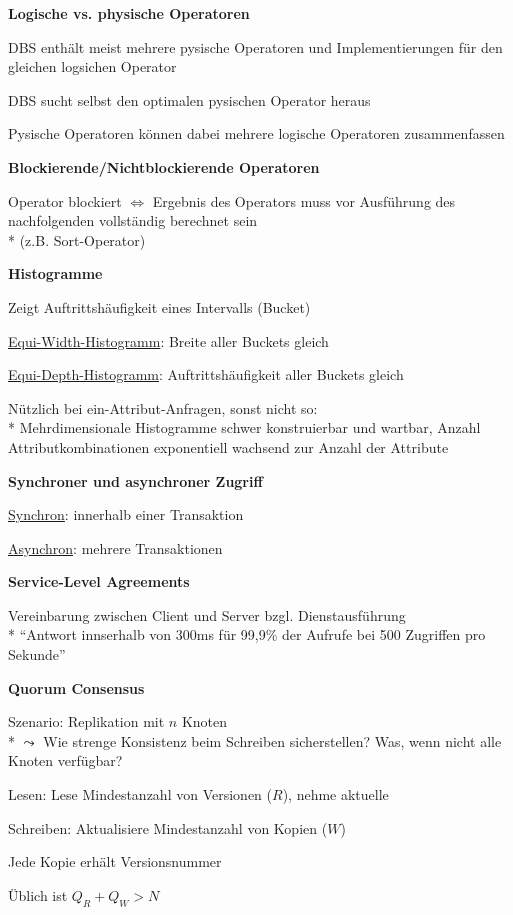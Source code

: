 \textbf{Logische vs. physische Operatoren}
\begin{items}
	\item DBS enthält meist mehrere pysische Operatoren und Implementierungen für den gleichen logsichen Operator
	\item DBS sucht selbst den optimalen pysischen Operator heraus
	\item Pysische Operatoren können dabei mehrere logische Operatoren zusammenfassen
\end{items}

\textbf{Blockierende/Nichtblockierende Operatoren}
\begin{items}
	\item Operator blockiert \( \Leftrightarrow \) Ergebnis des Operators muss vor Ausführung des nachfolgenden vollständig berechnet sein \\* (z.B. Sort-Operator)
\end{items}

\textbf{Histogramme}
\begin{items}
	\item Zeigt Auftrittshäufigkeit eines Intervalls (Bucket)
	\item \underline{Equi-Width-Histogramm}: Breite aller Buckets gleich
	\item \underline{Equi-Depth-Histogramm}: Auftrittshäufigkeit aller Buckets gleich
	\item Nützlich bei ein-Attribut-Anfragen, sonst nicht so:
		\\*
		Mehrdimensionale Histogramme schwer konstruierbar und wartbar, Anzahl Attributkombinationen exponentiell wachsend zur Anzahl der Attribute
\end{items}

\textbf{Synchroner und asynchroner Zugriff}
\begin{items}
	\item \underline{Synchron}: innerhalb einer Transaktion
	\item \underline{Asynchron}: mehrere Transaktionen
\end{items}

\textbf{Service-Level Agreements}
\begin{items}
	\item Vereinbarung zwischen Client und Server bzgl. Dienstausführung
		\\*
		``Antwort innserhalb von 300ms für 99,9\% der Aufrufe bei 500 Zugriffen pro Sekunde''
\end{items}

\textbf{Quorum Consensus}
\begin{items}
	\item Szenario: Replikation mit \( n \) Knoten
		\\*
		\( \leadsto \) Wie strenge Konsistenz beim Schreiben sicherstellen? Was, wenn nicht alle Knoten verfügbar?
	\item Lesen: Lese Mindestanzahl von Versionen (\( R \)), nehme aktuelle
	\item Schreiben: Aktualisiere Mindestanzahl von Kopien (\( W \))
	\item Jede Kopie erhält Versionsnummer
	\item Üblich ist \( Q_R+Q_W > N \)
\end{items}

